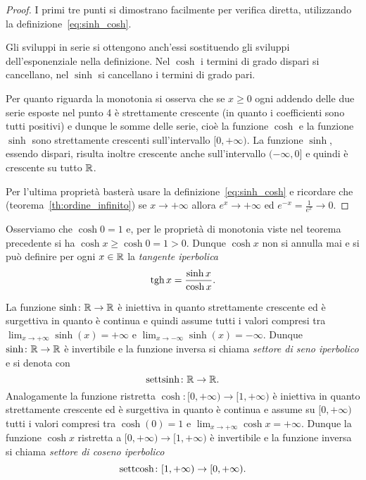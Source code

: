\begin{proof}
I primi tre punti si dimostrano facilmente per verifica diretta,
utilizzando la definizione~\eqref{eq:sinh_cosh}.

Gli sviluppi in serie si ottengono anch'essi sostituendo
gli sviluppi dell'esponenziale nella definizione.
Nel $\cosh$ i termini di grado dispari si cancellano, nel $\sinh$ si cancellano
i termini di grado pari.

Per quanto riguarda la monotonia si osserva che se $x\ge 0$ ogni
addendo delle due serie esposte nel punto 4 è strettamente crescente
(in quanto i coefficienti sono tutti positivi) e dunque le somme delle serie,
cioè la funzione $\cosh$ e la funzione $\sinh$ sono strettamente crescenti
sull'intervallo $[0,+\infty)$. La funzione $\sinh$, essendo dispari,
risulta inoltre crescente anche sull'intervallo $(-\infty,0]$ e quindi
è crescente su tutto ${\mathbb R}$.

Per l'ultima proprietà basterà usare la definizione~\eqref{eq:sinh_cosh}
e ricordare che (teorema~\ref{th:ordine_infinito})
se $x\to +\infty$ allora
$e^x\to +\infty$ ed $e^{-x}=\frac{1}{e^{x}} \to 0$.
\end{proof}

Osserviamo che $\cosh 0 = 1$ e, per le proprietà di monotonia viste nel teorema
precedente si ha $\cosh x \ge \cosh 0 = 1 > 0$. Dunque $\cosh x$ non si annulla
mai e si può definire per ogni $x\in {\mathbb R}$ la \emph{tangente iperbolica}
%
\mymargin{$\tgh$}%
\[
    \operatorname{tgh} x = \frac{\sinh x}{\cosh x}.
\]

La funzione $\sinh\colon {\mathbb R}\to{\mathbb R}$ è iniettiva in quanto strettamente crescente ed
è surgettiva in quanto è continua e quindi assume tutti i valori compresi tra
$\lim_{x\to+\infty} \sinh(x) = +\infty$ e $\lim_{x\to -\infty} \sinh(x) = -\infty$. 
Dunque $\sinh\colon {\mathbb R} \to {\mathbb R}$
è invertibile e la funzione inversa si chiama \emph{settore di seno iperbolico}
e si denota con
\mymargin{$\settsinh$}
\[
    \operatorname{settsinh} \colon {\mathbb R} \to {\mathbb R}.
\]
Analogamente la funzione ristretta $\cosh\colon [0,+\infty)\to [1,+\infty)$ è
iniettiva in quanto strettamente crescente ed è surgettiva in quanto
è continua e assume su $[0,+\infty)$ tutti i valori compresi tra $\cosh(0)=1$ e
$\lim_{x\to +\infty} \cosh x = +\infty$.
Dunque la funzione $\cosh x$ ristretta a $[0,+\infty)\to [1,+\infty)$
è invertibile e la funzione inversa si chiama \emph{settore di coseno iperbolico}
\mymargin{$\settcosh$}
\[
    \operatorname{settcosh} \colon [1,+\infty)\to [0,+\infty).
\]

